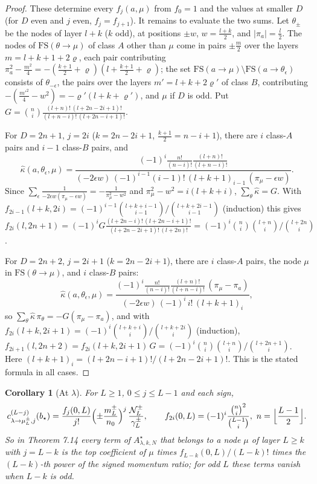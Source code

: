 \documentclass[11pt]{article}
\newtheorem{corollary}[theorem]{Corollary}
\theoremstyle{remark}
\begin{document}
\begin{proof}
These determine every $f_j(a,\mu)$ from $f_0=1$ and the values at smaller $D$
(for $D$ even and $j$ even, $f_j=f_{j+1}$).  It remains to evaluate the two
sums.  Let $\theta_\pm$ be the nodes of layer $l+k$ ($k$ odd), at positions
$\pm w$, $w=\frac{l+k}2$, and $|\pi_a|=\frac l2$.  The nodes of
$\mathrm{FS}(\theta\to\mu)$ of class $A$ other than $\mu$ come in pairs $\pm\frac
m2$ over the layers $m=l+k+1+2\varrho$, each pair contributing
$\pi_a^2-\frac{m^2}4=-(\frac{k+1}2+\varrho)(l+\frac{k+1}2+\varrho)$; the set
$\mathrm{FS}(a\to\mu)\setminus\mathrm{FS}(a\to\theta_\epsilon)$ consists of
$\theta_{-\epsilon}$, the pairs over the layers $m'=l+k+2\varrho'$ of class $B$,
contributing $-(\frac{m'^2}4-w^2)=-\varrho'(l+k+\varrho')$, and $\mu$ if $D$ is
odd.  Put
$G=\binom ni\frac{(l+n)!\,(l+2n-2i+1)!}{(l+n-i)!\,(l+2n-i+1)!}$.

For $D=2n+1$, $j=2i$ ($k=2n-2i+1$, $\frac{k+1}2=n-i+1$), there are $i$
class-$A$ pairs and $i-1$ class-$B$ pairs, and
\[
 \hat\kappa(a,\theta_\epsilon,\mu)=
 \frac{(-1)^i\frac{n!}{(n-i)!}\frac{(l+n)!}{(l+n-i)!}}
 {(-2\epsilon w)\,(-1)^{i-1}(i-1)!\,(l+k+1)_{i-1}\,(\pi_\mu-\epsilon w)} .
\]
Since $\sum_\epsilon\frac1{-2\epsilon w(\pi_\mu-\epsilon w)}=-\frac1{\pi_\mu^2-w^2}$
and $\pi_\mu^2-w^2=i(l+k+i)$, $\sum_\theta\hat\kappa=G$.  With
$f_{2i-1}(l+k,2i)=(-1)^{i-1}\binom{l+k+i-1}{i-1}/\binom{l+k+2i-1}{i-1}$ (induction)
this gives
$f_{2i}(l,2n+1)=(-1)^iG\frac{(l+2n-i)!\,(l+2n-i+1)!}{(l+2n-2i+1)!\,(l+2n)!}
=(-1)^i\binom ni\binom{l+n}i/\binom{l+2n}i$.

For $D=2n+2$, $j=2i+1$ ($k=2n-2i+1$), there are $i$ class-$A$ pairs, the node
$\mu$ in $\mathrm{FS}(\theta\to\mu)$, and $i$ class-$B$ pairs:
\[
 \hat\kappa(a,\theta_\epsilon,\mu)=
 \frac{(-1)^i\frac{n!}{(n-i)!}\frac{(l+n)!}{(l+n-i)!}\,(\pi_\mu-\pi_a)}
 {(-2\epsilon w)\,(-1)^i\,i!\,(l+k+1)_i},
\]
so $\sum_\theta\hat\kappa\,\pi_\theta=-G(\pi_\mu-\pi_a)$, and with
$f_{2i}(l+k,2i+1)=(-1)^i\binom{l+k+i}i/\binom{l+k+2i}i$ (induction),
$f_{2i+1}(l,2n+2)=f_{2i}(l+k,2i+1)\,G=(-1)^i\binom ni\binom{l+n}i/\binom{l+2n+1}i$.
Here $(l+k+1)_i=(l+2n-i+1)!/(l+2n-2i+1)!$.  This is the stated formula in all
cases.
\end{proof}

\begin{corollary}[At $\lambda$]\label{cor:kjL}
For $L\ge1$, $0\le j\le L-1$ and each sign,
\[
 c^{(L-j)}_{\lambda\to\mu^\pm_L,j}(b_\star)
 =\frac{f_j(0,L)}{j!}\Bigl(\pm\frac{m^\pm_L}{n_0}\Bigr)^{j}\,
 \frac{\mathcal N^\pm_L}{\gamma^\pm_L},\qquad
 f_{2i}(0,L)=(-1)^i\frac{\binom ni^2}{\binom{L-1}i},\ n=\Bigl\lfloor\frac{L-1}2\Bigr\rfloor .
\]
So in Theorem 7.14 every term of $A^\star_{\lambda,k,N}$ that belongs to a node
$\mu$ of layer $L\ge k$ with $j=L-k$ is the top coefficient of $\mu$ times
$f_{L-k}(0,L)/(L-k)!$ times the $(L-k)$-th power of the signed momentum
ratio; for odd $L$ these terms vanish when $L-k$ is odd.
\end{corollary}
\end{document}
